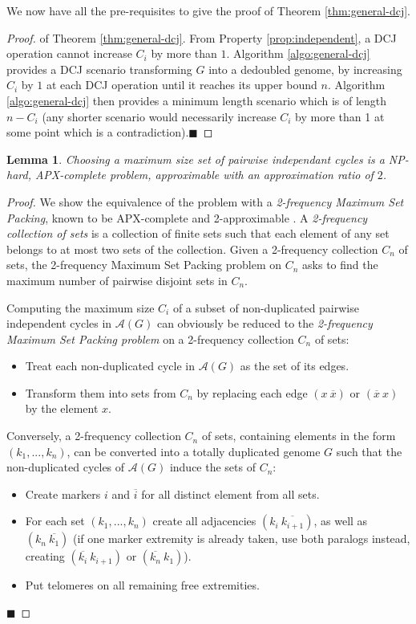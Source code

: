 \documentclass[11pt,final,twoside,nofrench]{thlifl}
\newcommand{\qed}{\ensuremath{\blacksquare}}
\newcommand{\snd}[1]{ \ensuremath{\overline{#1}} }
\newtheorem{proof}{Proof}
\newtheorem{lemma}{Lemma}
\begin{document}
We now have all the pre-requisites to give the proof of Theorem  
\ref{thm:general-dcj}.

\begin{proof}{of Theorem  \ref{thm:general-dcj}.}
From Property \ref{prop:independent}, a DCJ operation cannot increase 
$C_i$ by more than $1$. Algorithm \ref{algo:general-dcj} provides a 
DCJ scenario transforming $G$ into a dedoubled genome, by increasing  
$C_i$ by $1$ at each DCJ operation until it reaches its upper bound $n$.  
Algorithm  \ref{algo:general-dcj} then provides a minimum length scenario
which is of length $n-C_i$ (any shorter scenario would necessarily increase $C_i$ by more than 1 at some point which is a contradiction).\qed
\end{proof}

\begin{lemma}
\label{lem:complecity-dcj}
Choosing a maximum size set of pairwise independant cycles is a NP-hard, APX-complete problem, approximable with an approximation ratio of $2$.
\end{lemma}
\begin{proof}
We show the equivalence of the problem with a
 \emph{2-frequency Maximum Set Packing}, known to be APX-complete
\cite{BF-95} and 2-approximable \cite{H-83}. 
A \emph{2-frequency collection of sets} 
is a collection of finite sets such that each element of any set belongs 
to at most two sets of the collection. Given a 2-frequency collection $C_n$
of sets, the 2-frequency Maximum Set Packing problem on $C_n$
asks to find the maximum
number of pairwise disjoint sets in $C_n$.

Computing the maximum size $C_{i}$ of a subset of non-duplicated pairwise independent cycles in $\mathcal{A}(G)$ can obviously be reduced to the \emph{2-frequency 
Maximum Set Packing problem} on a 2-frequency collection $C_n$ of sets:

\begin{itemize}
\item Treat each non-duplicated cycle in $\mathcal{A}(G)$ as the set of its edges.
\item Transform them into sets from $C_n$ by replacing each edge $(x~\snd{x})$ or $(\snd{x}~x)$ by the element $x$.
\end{itemize}

Conversely, a 2-frequency collection $C_n$
of sets, containing elements in the form $(k_1,...,k_n)$, can be converted into a totally duplicated genome $G$ such that 
the non-duplicated cycles of $\mathcal{A}(G)$ induce the sets of $C_n$:

\begin{itemize}
\item Create markers $i$ and $\snd{i}$ for all distinct element from all sets.
\item For each set $(k_1,...,k_n)$ create all adjacencies $(k_i~\snd{k_{i+1}})$, as well as $(k_n~\snd{k_1})$ (if one marker extremity is already taken, use both paralogs instead, creating $(\snd{k_i}~k_{i+1})$ or $(\snd{k_n}~k_1)$). 
\item Put telomeres on all remaining free extremities.
\end{itemize}
\qed
\end{proof}
\end{document}
